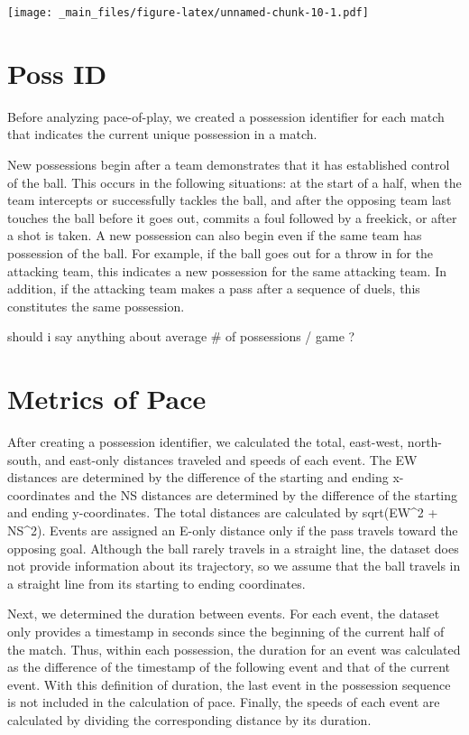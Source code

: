 \documentclass[]{book}
\begin{document}
\texttt{[image: \_main\_files/figure-latex/unnamed-chunk-10-1.pdf]}

\hypertarget{poss-id}{%
\section{Poss ID}\label{poss-id}}

Before analyzing pace-of-play, we created a possession identifier for each match that indicates the current unique possession in a match.

New possessions begin after a team demonstrates that it has established control of the ball. This occurs in the following situations: at the start of a half, when the team intercepts or successfully tackles the ball, and after the opposing team last touches the ball before it goes out, commits a foul followed by a freekick, or after a shot is taken. A new possession can also begin even if the same team has possession of the ball. For example, if the ball goes out for a throw in for the attacking team, this indicates a new possession for the same attacking team. In addition, if the attacking team makes a pass after a sequence of duels, this constitutes the same possession.

should i say anything about average \# of possessions / game ?

\hypertarget{metrics-of-pace}{%
\section{Metrics of Pace}\label{metrics-of-pace}}

After creating a possession identifier, we calculated the total, east-west, north-south, and east-only distances traveled and speeds of each event. The EW distances are determined by the difference of the starting and ending x-coordinates and the NS distances are determined by the difference of the starting and ending y-coordinates. The total distances are calculated by sqrt(EW\^{}2 + NS\^{}2). Events are assigned an E-only distance only if the pass travels toward the opposing goal. Although the ball rarely travels in a straight line, the dataset does not provide information about its trajectory, so we assume that the ball travels in a straight line from its starting to ending coordinates.

Next, we determined the duration between events. For each event, the dataset only provides a timestamp in seconds since the beginning of the current half of the match. Thus, within each possession, the duration for an event was calculated as the difference of the timestamp of the following event and that of the current event. With this definition of duration, the last event in the possession sequence is not included in the calculation of pace. Finally, the speeds of each event are calculated by dividing the corresponding distance by its duration.
\end{document}

